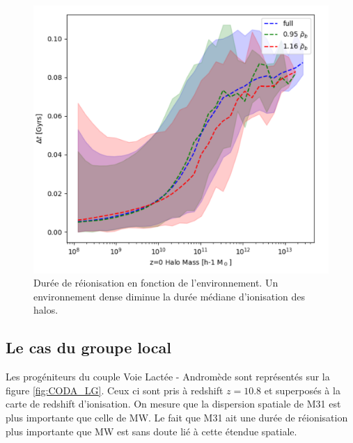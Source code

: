 \begin{figure}
		\centering
		\includegraphics[width=.95\linewidth]{img/05/median_dt_envir.pdf}
        \caption[Durée de réionisation et environnement]{Durée de réionisation en fonction de l'environnement.
        Un environnement dense diminue la durée médiane d'ionisation des halos.
		\label{fig:CODA_environnement}}
\end{figure}


\subsection{Le cas du groupe local}


Les progéniteurs du couple Voie Lactée - Andromède sont représentés sur la figure \ref{fig:CODA_LG}.
Ceux ci sont pris à redshift $z=10.8$ et superposés à la carte de redshift d'ionisation.
On mesure que la dispersion spatiale de M31 est plus importante que celle de MW.
Le fait que M31 ait une durée de réionisation plus importante que MW est sans doute lié à cette étendue spatiale.


